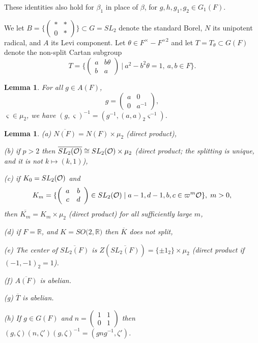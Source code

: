 \documentclass[12pt,letterpaper,openany]{book}
\theoremstyle{plain}
\newtheorem{lemma}[theorem]{Lemma}
\theoremstyle{definition}
\theoremstyle{remark}
\theoremstyle{remark}
\begin{document}
These identities also hold for $\beta _1$ in place of $\beta$,
for $g,h,g_1,g_2\in G_1(F)$.

We let $B=\{\left(
\begin{array}{cc}
\ast  & * \\
0 & *
\end{array}
\right) \}\subset G=SL_2$ denote the standard Borel, $N$ its unipotent
radical, and $A$ its Levi component. Let
$\theta\in F^\times -F^{\times 2}$ and let
$T=T_\theta\subset G(F)$ denote the non-split Cartan subgroup
\[
T=\{
    \left(
    \begin{array}{cc}
    a&b\theta\\
    b&a
    \end{array}
    \right)
    \ |\ a^2-b^2\theta =1,\ a,b\in F
  \}.
\]
\begin{lemma}\label{lem:Ainv}
For all $g\in A(F)$, 
\[
g=\left(
\begin{array}{cc}
a & 0 \\
0 & a^{-1}
\end{array}
\right) ,
\]
$\varsigma \in \mu _2$, we have $(g,\varsigma
)^{-1}=(g^{-1},(a,a)_2\varsigma ^{-1})$.
\end{lemma}

\begin{lemma}\label{lem:facts}
(a) $\overline{N(F)}=N(F)\times \mu _2$ (direct product),

(b) if $p>2$ then
$\overline{SL_2({\cal O})}\cong SL_2({\cal O})\times
\mu _2$ (direct product; the splitting is unique, and it is not
$k\mapsto(k,1)$),

(c) if $K_0=SL_2({\cal{O}})$ and
\[
K_{m}=\{\left(
\begin{array}{cc}
a & b \\
c & d
\end{array}
\right) \in SL_2({\cal{O}})\;|\;a-1,d-1,b,c\in \varpi ^m{\cal{O}}\},
\;m>0,
\]
then $\overline{K_{m}}=K_{m}\times \mu _2$
(direct product) for all sufficiently large $m$,

(d) if $F={\mathbb {R}}$, and $K=SO(2,{\mathbb {R})}$ then
$\overline{K}$ does not split,

(e) The center of $\overline{SL_2(F)}$ is $Z(\overline{SL_2(F)})=\{\pm
1_2\}\times \mu _2$ (direct product if $(-1,-1)_2=1$).

(f) $\overline{A(F)}$ is abelian.

(g) $\overline{T}$ is abelian.

(h) If $g\in G(F)$ and
$n=
\left(
\begin{array}{cc}
1 & 1\\
0 & 1
\end{array}
\right)
$
then $(g,\zeta)(n,\zeta ')(g,\zeta)^{-1}
=(gng^{-1},\zeta')$.

\end{lemma}
\end{document}
